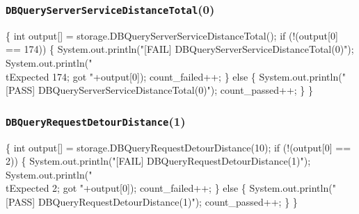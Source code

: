 \documentclass{article}
\def\nwendcode{\endtrivlist \endgroup}
\let\nwdocspar=\par
\begin{document}
\subsubsection{{\tt{}DBQueryServerServiceDistanceTotal}(0)}
\nwenddocs{}\endmoddef{}
\{
  int output[] = storage.DBQueryServerServiceDistanceTotal();
  if (!(output[0] == 174)) \{
    System.out.println("[FAIL] DBQueryServerServiceDistanceTotal(0)");
    System.out.println("\\tExpected 174; got "+output[0]);
    count_failed++;
  \} else \{
    System.out.println("[PASS] DBQueryServerServiceDistanceTotal(0)");
    count_passed++;
  \}
\}
\nwendcode{}\nwdocspar
\subsubsection{{\tt{}DBQueryRequestDetourDistance}(1)}
\nwenddocs{}\endmoddef{}
\{
  int output[] = storage.DBQueryRequestDetourDistance(10);
  if (!(output[0] == 2)) \{
    System.out.println("[FAIL] DBQueryRequestDetourDistance(1)");
    System.out.println("\\tExpected 2; got "+output[0]);
    count_failed++;
  \} else \{
    System.out.println("[PASS] DBQueryRequestDetourDistance(1)");
    count_passed++;
  \}
\}
\nwendcode{}\nwdocspar
\end{document}
